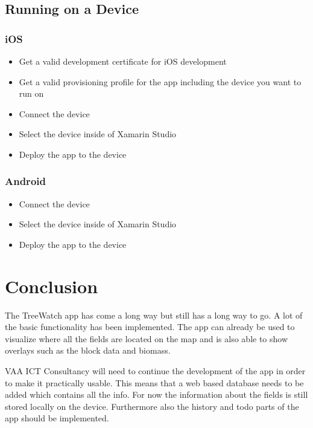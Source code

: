 \subsection{Running on a Device}

\subsubsection{iOS}
\begin{itemize}
\item Get a valid development certificate for iOS development
\item Get a valid provisioning profile for the app including the device you want to run on
\item Connect the device
\item Select the device inside of Xamarin Studio
\item Deploy the app to the device
\end{itemize}
\subsubsection{Android}
\begin{itemize}
\item Connect the device
\item Select the device inside of Xamarin Studio
\item Deploy the app to the device
\end{itemize}


\section{Conclusion}
The TreeWatch app has come a long way but still has a long way to go. A lot of the basic functionality has been implemented. The app can already be used to visualize where all the fields are located on the map and is also able to show overlays such as the block data and biomass.

VAA ICT Consultancy will need to continue the development of the app in order to make it practically usable. This means that a web based database needs to be added which contains all the info. For now the information about the fields is still stored locally on the device. Furthermore also the history and todo parts of the app should be implemented.


